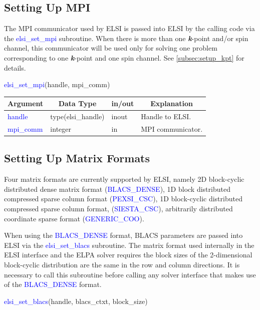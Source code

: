 \documentclass{report}
\begin{document}
\subsection{Setting Up MPI}
\label{subsec:setup_mpi}
The MPI communicator used by ELSI is passed into ELSI by the calling code via the \textcolor{blue}{elsi\_set\_mpi} subroutine.  When there is more than one \textbf{\textit{k}}-point and/or spin channel, this communicator will be used only for solving one problem corresponding to one \textbf{\textit{k}}-point and one spin channel.  See \ref{subsec:setup_kpt} for details.
\begin{labeling}{\hspace{6cm}}
\item [\hspace{0.3cm} \textcolor{blue}{elsi\_set\_mpi}(handle, mpi\_comm)]
\end{labeling}

\begin{tabular}[]{|p{30mm}|p{30mm}|p{15mm}|p{90mm}|}
\hline
\multicolumn{1}{|c|}{\textbf{Argument}} & \multicolumn{1}{c|}{\textbf{Data Type}} & \multicolumn{1}{c|}{\textbf{in/out}} & \multicolumn{1}{c|}{\textbf{Explanation}}\\
\hline
\textcolor{blue}{handle}    & type(elsi\_handle) & inout & Handle to ELSI.\\
\hline
\textcolor{blue}{mpi\_comm} & integer            & in    & MPI communicator.\\
\hline
\end{tabular}

\subsection{Setting Up Matrix Formats}
\label{subsec:setup_matrix}
Four matrix formats are currently supported by ELSI, namely 2D block-cyclic distributed dense matrix format (\textcolor{blue}{BLACS\_DENSE}), 1D block distributed compressed sparse column format (\textcolor{blue}{PEXSI\_CSC}), 1D block-cyclic distributed compressed sparse column format, (\textcolor{blue}{SIESTA\_CSC}), arbitrarily distributed coordinate sparse format (\textcolor{blue}{GENERIC\_COO}).

When using the \textcolor{blue}{BLACS\_DENSE} format, BLACS parameters are passed into ELSI via the \textcolor{blue}{elsi\_set\_blacs} subroutine.  The matrix format used internally in the ELSI interface and the ELPA solver requires the block sizes of the 2-dimensional block-cyclic distribution are the same in the row and column directions.  It is necessary to call this subroutine before calling any solver interface that makes use of the \textcolor{blue}{BLACS\_DENSE} format.
\begin{labeling}{\hspace{6cm}}
\item [\hspace{0.3cm} \textcolor{blue}{elsi\_set\_blacs}(handle, blacs\_ctxt, block\_size)]
\end{labeling}
\end{document}
